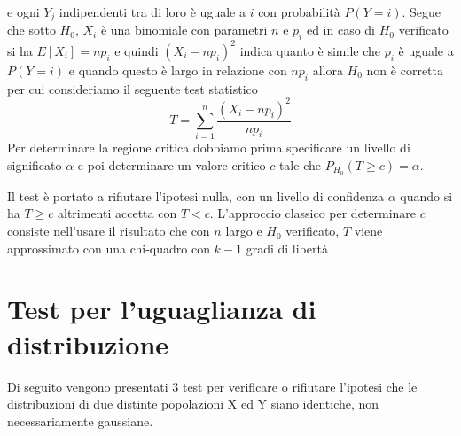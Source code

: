 \begin{itemize}
          e ogni $Y_j$ indipendenti tra di loro è uguale a $i$ con probabilità $P(Y = i)$.\newline
          Segue che sotto $H_0$, $X_i$ è una binomiale con parametri $n$ e $p_i$ ed in caso di $H_0$ verificato si ha $E[X_i] = np_i$ e quindi $(X_i - np_i)^2$ indica
          quanto è simile che $p_i$ è uguale a $P(Y = i)$ e quando questo è largo in relazione con $np_i$ allora $H_0$ non è corretta per cui consideriamo il seguente test statistico
          \[ T = \sum _{i = 1}^n \frac{(X_i - np_i)^2}{np_i} \]
          Per determinare la regione critica dobbiamo prima specificare un livello di significato $\alpha$ e poi determinare un valore critico $c$ tale che $P_{H_0}(T \geq c) = \alpha$.

          Il test è portato a rifiutare l'ipotesi nulla, con un livello di confidenza $\alpha$ quando si ha $T \geq c$ altrimenti accetta con $T < c$.\newline
          L'approccio classico per determinare $c$ consiste nell'usare il risultato che con $n$ largo e $H_0$ verificato, $T$ viene approssimato con una chi-quadro con $k - 1$
          gradi di libertà



\end{itemize}

\section{Test per l'uguaglianza di distribuzione}
Di seguito vengono presentati 3 test per verificare o rifiutare l’ipotesi che le distribuzioni
di due distinte popolazioni X ed Y siano identiche, non necessariamente gaussiane.

